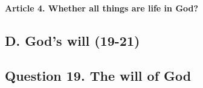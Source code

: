 \documentclass{ucetd}
\begin{document}
\paragraph{Article 4. Whether all things are life in God?}
\subsection{D. God's will (19-21)}\subsection{Question 19. The will of God}
\end{document}
